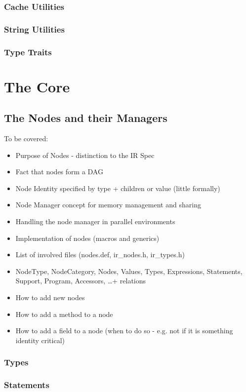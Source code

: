 \subsubsection{Cache Utilities}
\subsubsection{String Utilities}
\subsubsection{Type Traits}

\section{The Core}
\subsection{The Nodes and their Managers}

To be covered:
\begin{itemize}
  \item Purpose of Nodes - distinction to the IR Spec
  \item Fact that nodes form a DAG
  \item Node Identity specified by type + children or value (little formally)
  \item Node Manager concept for memory management and sharing
  \item Handling the node manager in parallel environments
  \item Implementation of nodes (macros and generics)
  \item List of involved files (nodes.def, ir_nodes.h, ir_types.h)
  \item NodeType, NodeCategory, Nodes, Values, Types, Expressions, Statements,
  Support, Program, Accessors, \ldots + relations
  \item How to add new nodes
  \item How to add a method to a node
  \item How to add a field to a node (when to do so - e.g. not if it is
  something identity critical)
\end{itemize}

\subsubsection{Types}
\subsubsection{Statements}
